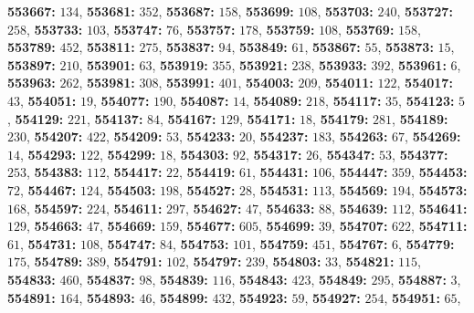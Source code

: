 \textsf{\bfseries 553667:} $134$, \textsf{\bfseries 553681:} $352$, \textsf{\bfseries 553687:} $158$, \textsf{\bfseries 553699:} $108$, \textsf{\bfseries 553703:} $240$, \textsf{\bfseries 553727:} $258$, \textsf{\bfseries 553733:} $103$, \textsf{\bfseries 553747:} $76$, \textsf{\bfseries 553757:} $178$, \textsf{\bfseries 553759:} $108$, \textsf{\bfseries 553769:} $158$, \textsf{\bfseries 553789:} $452$, \textsf{\bfseries 553811:} $275$, \textsf{\bfseries 553837:} $94$, \textsf{\bfseries 553849:} $61$, \textsf{\bfseries 553867:} $55$, \textsf{\bfseries 553873:} $15$, \textsf{\bfseries 553897:} $210$, \textsf{\bfseries 553901:} $63$, \textsf{\bfseries 553919:} $355$, \textsf{\bfseries 553921:} $238$, \textsf{\bfseries 553933:} $392$, \textsf{\bfseries 553961:} $6$, \textsf{\bfseries 553963:} $262$, \textsf{\bfseries 553981:} $308$, \textsf{\bfseries 553991:} $401$, \textsf{\bfseries 554003:} $209$, \textsf{\bfseries 554011:} $122$, \textsf{\bfseries 554017:} $43$, \textsf{\bfseries 554051:} $19$, \textsf{\bfseries 554077:} $190$, \textsf{\bfseries 554087:} $14$, \textsf{\bfseries 554089:} $218$, \textsf{\bfseries 554117:} $35$, \textsf{\bfseries 554123:} $5$, \textsf{\bfseries 554129:} $221$, \textsf{\bfseries 554137:} $84$, \textsf{\bfseries 554167:} $129$, \textsf{\bfseries 554171:} $18$, \textsf{\bfseries 554179:} $281$, \textsf{\bfseries 554189:} $230$, \textsf{\bfseries 554207:} $422$, \textsf{\bfseries 554209:} $53$, \textsf{\bfseries 554233:} $20$, \textsf{\bfseries 554237:} $183$, \textsf{\bfseries 554263:} $67$, \textsf{\bfseries 554269:} $14$, \textsf{\bfseries 554293:} $122$, \textsf{\bfseries 554299:} $18$, \textsf{\bfseries 554303:} $92$, \textsf{\bfseries 554317:} $26$, \textsf{\bfseries 554347:} $53$, \textsf{\bfseries 554377:} $253$, \textsf{\bfseries 554383:} $112$, \textsf{\bfseries 554417:} $22$, \textsf{\bfseries 554419:} $61$, \textsf{\bfseries 554431:} $106$, \textsf{\bfseries 554447:} $359$, \textsf{\bfseries 554453:} $72$, \textsf{\bfseries 554467:} $124$, \textsf{\bfseries 554503:} $198$, \textsf{\bfseries 554527:} $28$, \textsf{\bfseries 554531:} $113$, \textsf{\bfseries 554569:} $194$, \textsf{\bfseries 554573:} $168$, \textsf{\bfseries 554597:} $224$, \textsf{\bfseries 554611:} $297$, \textsf{\bfseries 554627:} $47$, \textsf{\bfseries 554633:} $88$, \textsf{\bfseries 554639:} $112$, \textsf{\bfseries 554641:} $129$, \textsf{\bfseries 554663:} $47$, \textsf{\bfseries 554669:} $159$, \textsf{\bfseries 554677:} $605$, \textsf{\bfseries 554699:} $39$, \textsf{\bfseries 554707:} $622$, \textsf{\bfseries 554711:} $61$, \textsf{\bfseries 554731:} $108$, \textsf{\bfseries 554747:} $84$, \textsf{\bfseries 554753:} $101$, \textsf{\bfseries 554759:} $451$, \textsf{\bfseries 554767:} $6$, \textsf{\bfseries 554779:} $175$, \textsf{\bfseries 554789:} $389$, \textsf{\bfseries 554791:} $102$, \textsf{\bfseries 554797:} $239$, \textsf{\bfseries 554803:} $33$, \textsf{\bfseries 554821:} $115$, \textsf{\bfseries 554833:} $460$, \textsf{\bfseries 554837:} $98$, \textsf{\bfseries 554839:} $116$, \textsf{\bfseries 554843:} $423$, \textsf{\bfseries 554849:} $295$, \textsf{\bfseries 554887:} $3$, \textsf{\bfseries 554891:} $164$, \textsf{\bfseries 554893:} $46$, \textsf{\bfseries 554899:} $432$, \textsf{\bfseries 554923:} $59$, \textsf{\bfseries 554927:} $254$, \textsf{\bfseries 554951:} $65$, 
